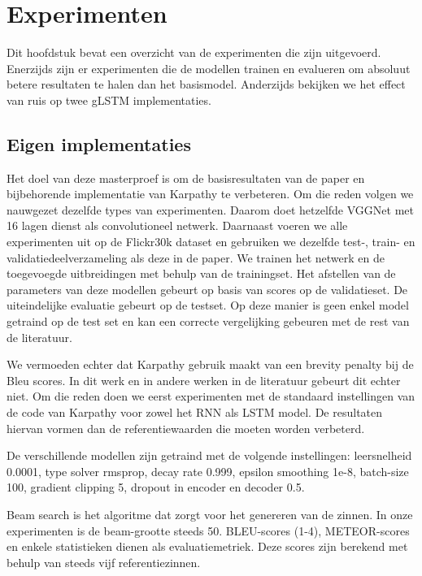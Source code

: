 \chapter{Experimenten} %
\label{cha:experimenten}
Dit hoofdstuk bevat een overzicht van de experimenten die zijn uitgevoerd. Enerzijds zijn er experimenten die de modellen trainen en evalueren om absoluut betere resultaten te halen dan het basismodel. Anderzijds bekijken we het effect van ruis op twee gLSTM implementaties.

\section{Eigen implementaties} %
\label{sec:eigen_implementaties_exp}
Het doel van deze masterproef is om de basisresultaten van de paper en bijbehorende implementatie van Karpathy\cite{Karpathy2015} te verbeteren. Om die reden volgen we nauwgezet dezelfde types van experimenten. Daarom doet hetzelfde VGGNet met 16 lagen dienst als convolutioneel netwerk. Daarnaast voeren we alle experimenten uit op de Flickr30k dataset en gebruiken we dezelfde test-, train- en validatiedeelverzameling als deze in de paper. We trainen het netwerk en de toegevoegde uitbreidingen met behulp van de trainingset. Het afstellen van de parameters van deze modellen gebeurt op basis van scores op de validatieset. De uiteindelijke evaluatie gebeurt op de testset. Op deze manier is geen enkel model getraind op de test set en kan een correcte vergelijking gebeuren met de rest van de literatuur.

We vermoeden echter dat Karpathy gebruik maakt van een brevity penalty  bij de Bleu scores. In dit werk en in andere werken in de literatuur gebeurt dit echter niet. Om die reden doen we eerst experimenten met de standaard instellingen van de code van Karpathy voor zowel het RNN als LSTM model. De resultaten hiervan vormen dan de referentiewaarden die moeten worden verbeterd. 

De verschillende modellen zijn getraind met de volgende instellingen: leersnelheid 0.0001, type solver rmsprop, decay rate 0.999, epsilon smoothing 1e-8, batch-size 100, gradient clipping 5, dropout in encoder en decoder 0.5. 

Beam search is het algoritme dat zorgt voor het genereren van de zinnen. In onze experimenten is de beam-grootte steeds 50.
BLEU-scores (1-4), METEOR-scores en enkele statistieken dienen als evaluatiemetriek. Deze scores zijn berekend met behulp van steeds vijf referentiezinnen.

